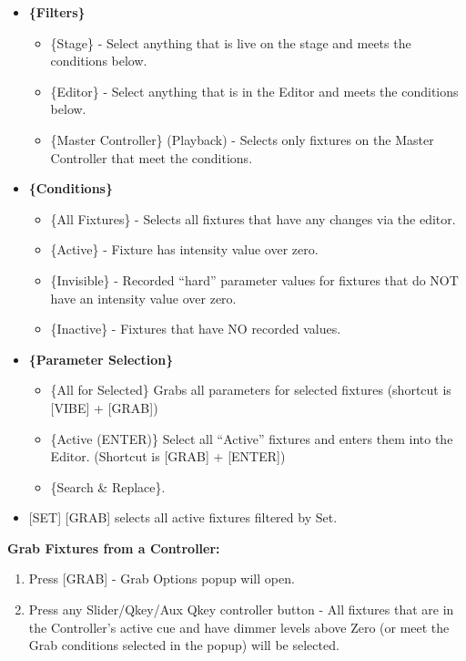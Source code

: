 \documentclass[
]{article}
\begin{document}
\begin{itemize}
\item
  \textbf{\{Filters\}}

  \begin{itemize}
  \item
    \{Stage\} - Select anything that is live on the stage and meets the conditions below.
  \item
    \{Editor\} - Select anything that is in the Editor and meets the conditions below.
  \item
    \{Master Controller\} (Playback) - Selects only fixtures on the Master Controller that meet the conditions.
  \end{itemize}
\item
  \textbf{\{Conditions\}}

  \begin{itemize}
  \item
    \{All Fixtures\} - Selects all fixtures that have any changes via the editor.
  \item
    \{Active\} - Fixture has intensity value over zero.
  \item
    \{Invisible\} - Recorded ``hard'' parameter values for fixtures that do NOT have an intensity value over zero.
  \item
    \{Inactive\} - Fixtures that have NO recorded values.
  \end{itemize}
\item
  \textbf{\{Parameter Selection\}}

  \begin{itemize}
  \item
    \{All for Selected\} Grabs all parameters for selected fixtures (shortcut is {[}VIBE{]} + {[}GRAB{]})
  \item
    \{Active (ENTER)\} Select all ``Active'' fixtures and enters them into the Editor. (Shortcut is {[}GRAB{]} + {[}ENTER{]})
  \item
    \{Search \& Replace\}.
  \end{itemize}
\item
  {[}SET{]} {[}GRAB{]} selects all active fixtures filtered by Set.
\end{itemize}

\textbf{Grab Fixtures from a Controller:}

\begin{enumerate}
\def\labelenumi{\arabic{enumi}.}
\item
  Press {[}GRAB{]} - Grab Options popup will open.
\item
  Press any Slider/Qkey/Aux Qkey controller button - All fixtures that are in the Controller's active cue and have dimmer levels above Zero (or meet the Grab conditions selected in the popup) will be selected.
\end{enumerate}
\end{document}
